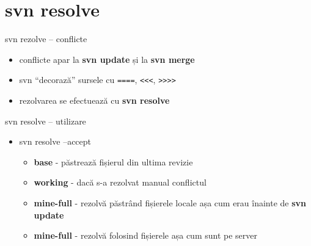\documentclass{beamer}
\begin{document}
\section{svn resolve}
\frame{\tableofcontents[currentsection]}

\begin{frame}{svn rezolve – conflicte}
  \begin{itemize}[<+->]
    \item conflicte apar la \textbf{svn update} și la \textbf{svn merge}
    \item svn ``decorază'' sursele cu \texttt{====}, \texttt{<<<}, \texttt{>>>>}
    \item rezolvarea se efectuează cu \textbf{svn resolve}
  \end{itemize}
\end{frame}


\begin{frame}{svn resolve – utilizare}
  \begin{itemize}[<+->]
    \item svn resolve --accept
      \begin{itemize}[<+->]
      \item \textbf{base} - păstrează fișierul din ultima revizie
      \item \textbf{working} - dacă s-a rezolvat manual conflictul
      \item \textbf{mine-full} - rezolvă păstrând fișierele locale așa cum erau înainte de \textbf{svn update}
      \item \textbf{mine-full} - rezolvă folosind fișierele așa cum sunt pe server
      \end{itemize}
  \end{itemize}
\end{frame}
\end{document}
